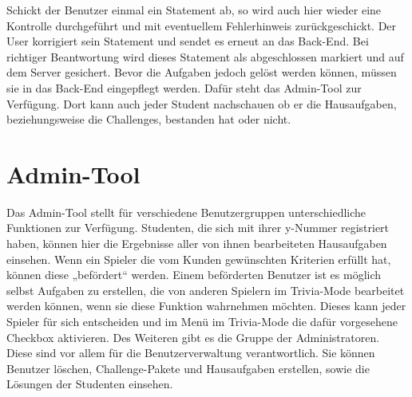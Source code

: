 Schickt der Benutzer einmal ein Statement ab, so wird auch hier wieder eine Kontrolle durchgef\"uhrt und mit eventuellem Fehlerhinweis zur\"uckgeschickt. 
Der User korrigiert sein Statement und sendet es erneut an das Back-End. Bei richtiger Beantwortung wird dieses Statement als 
abgeschlossen markiert und auf dem Server gesichert. Bevor die Aufgaben jedoch gel\"ost werden k\"onnen, m\"ussen sie in das Back-End eingepflegt 
werden. Daf\"ur steht das Admin-Tool zur Verf\"ugung. Dort kann auch jeder Student nachschauen ob er die Hausaufgaben, beziehungsweise die 
Challenges, bestanden hat oder nicht.


\section{Admin-Tool}
Das Admin-Tool stellt f\"ur verschiedene Benutzergruppen unterschiedliche Funktionen zur Verf\"ugung. Studenten, die sich mit ihrer y-Nummer registriert haben,
k\"onnen hier die Ergebnisse aller von ihnen bearbeiteten Hausaufgaben einsehen. Wenn ein Spieler die vom Kunden gew\"unschten Kriterien erf\"ullt hat, k\"onnen 
diese „bef\"ordert“ werden. Einem bef\"orderten Benutzer ist es m\"oglich selbst Aufgaben zu erstellen, die von anderen Spielern im Trivia-Mode bearbeitet werden k\"onnen, 
wenn sie diese Funktion wahrnehmen m\"ochten. Dieses kann jeder Spieler f\"ur sich entscheiden und im Men\"u im Trivia-Mode die daf\"ur vorgesehene Checkbox aktivieren.
Des Weiteren gibt es die Gruppe der Administratoren. Diese sind vor allem f\"ur die Benutzerverwaltung verantwortlich. Sie k\"onnen Benutzer l\"oschen, Challenge-Pakete 
und Hausaufgaben erstellen, sowie die L\"osungen der Studenten einsehen.

